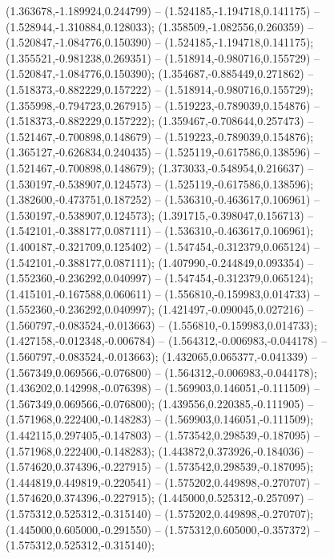  (1.363678,-1.189924,0.244799) -- (1.524185,-1.194718,0.141175) -- (1.528944,-1.310884,0.128033);
 (1.358509,-1.082556,0.260359) -- (1.520847,-1.084776,0.150390) -- (1.524185,-1.194718,0.141175);
 (1.355521,-0.981238,0.269351) -- (1.518914,-0.980716,0.155729) -- (1.520847,-1.084776,0.150390);
 (1.354687,-0.885449,0.271862) -- (1.518373,-0.882229,0.157222) -- (1.518914,-0.980716,0.155729);
 (1.355998,-0.794723,0.267915) -- (1.519223,-0.789039,0.154876) -- (1.518373,-0.882229,0.157222);
 (1.359467,-0.708644,0.257473) -- (1.521467,-0.700898,0.148679) -- (1.519223,-0.789039,0.154876);
 (1.365127,-0.626834,0.240435) -- (1.525119,-0.617586,0.138596) -- (1.521467,-0.700898,0.148679);
 (1.373033,-0.548954,0.216637) -- (1.530197,-0.538907,0.124573) -- (1.525119,-0.617586,0.138596);
 (1.382600,-0.473751,0.187252) -- (1.536310,-0.463617,0.106961) -- (1.530197,-0.538907,0.124573);
 (1.391715,-0.398047,0.156713) -- (1.542101,-0.388177,0.087111) -- (1.536310,-0.463617,0.106961);
 (1.400187,-0.321709,0.125402) -- (1.547454,-0.312379,0.065124) -- (1.542101,-0.388177,0.087111);
 (1.407990,-0.244849,0.093354) -- (1.552360,-0.236292,0.040997) -- (1.547454,-0.312379,0.065124);
 (1.415101,-0.167588,0.060611) -- (1.556810,-0.159983,0.014733) -- (1.552360,-0.236292,0.040997);
 (1.421497,-0.090045,0.027216) -- (1.560797,-0.083524,-0.013663) -- (1.556810,-0.159983,0.014733);
 (1.427158,-0.012348,-0.006784) -- (1.564312,-0.006983,-0.044178) -- (1.560797,-0.083524,-0.013663);
 (1.432065,0.065377,-0.041339) -- (1.567349,0.069566,-0.076800) -- (1.564312,-0.006983,-0.044178);
 (1.436202,0.142998,-0.076398) -- (1.569903,0.146051,-0.111509) -- (1.567349,0.069566,-0.076800);
 (1.439556,0.220385,-0.111905) -- (1.571968,0.222400,-0.148283) -- (1.569903,0.146051,-0.111509);
 (1.442115,0.297405,-0.147803) -- (1.573542,0.298539,-0.187095) -- (1.571968,0.222400,-0.148283);
 (1.443872,0.373926,-0.184036) -- (1.574620,0.374396,-0.227915) -- (1.573542,0.298539,-0.187095);
 (1.444819,0.449819,-0.220541) -- (1.575202,0.449898,-0.270707) -- (1.574620,0.374396,-0.227915);
 (1.445000,0.525312,-0.257097) -- (1.575312,0.525312,-0.315140) -- (1.575202,0.449898,-0.270707);
 (1.445000,0.605000,-0.291550) -- (1.575312,0.605000,-0.357372) -- (1.575312,0.525312,-0.315140);
